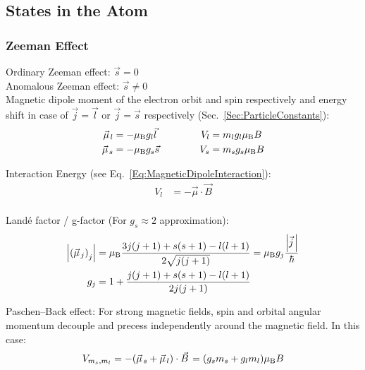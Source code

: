 	\subsection{States in the Atom}
		\subsubsection{Zeeman Effect}
			\noindent
			Ordinary Zeeman effect: $\vec{s} = 0$ \\
			Anomalous Zeeman effect: $\vec{s}\ne 0$ \\
			\noindent
			Magnetic dipole moment of the electron orbit and spin respectively and energy shift in case of $\vec{j}=\vec{l}$ or $\vec{j}=\vec{s}$ respectively (Sec.~\ref{Sec:ParticleConstants}):
			\begin{equation}
				\begin{aligned}
					\vec{\mu}_l &= -\mu_\text{B} g_l \vec{l} &\hsp V_l &= m_l g_l \mu_\text{B} B\\
					\vec{\mu}_s &= -\mu_\text{B} g_s \vec{s} &\hsp V_s &= m_s g_s \mu_\text{B} B\\
				\end{aligned}
			\end{equation}

			\noindent
			Interaction Energy (see Eq.~\ref{Eq:MagneticDipoleInteraction}):
			\begin{equation}
				\begin{aligned}
					V_l &= -\vec{\mu} \cdot \vec{B} \\
				\end{aligned}
			\end{equation}

			\noindent
			Landé factor / g-factor (For $g_s\approx 2$ approximation):
			\begin{equation}
				\begin{aligned}
					\abs{\qty(\vec{\mu}_j)_j} &= \mu_\text{B}\frac{3j(j+1)+s(s+1)-l(l+1)}{2\sqrt{j(j+1)}} = \mu_\text{B} g_j \frac{\abs{\vec{j}}}{\hbar}\\
					g_j &= 1+\frac{j(j+1) + s(s+1) - l(l+1)}{2j(j+1)} \\
				\end{aligned}
			\end{equation}

			\noindent
			Paschen--Back effect: For strong magnetic fields, spin and orbital angular momentum decouple and precess independently around the magnetic field. In this case:
			\begin{equation}
				V_{m_s,m_l} = -\qty(\vec{\mu}_s + \vec{\mu}_l)\cdot\vec{B}
				=\qty(g_s m_s + g_l m_l) \mu_\text{B} B
			\end{equation}

